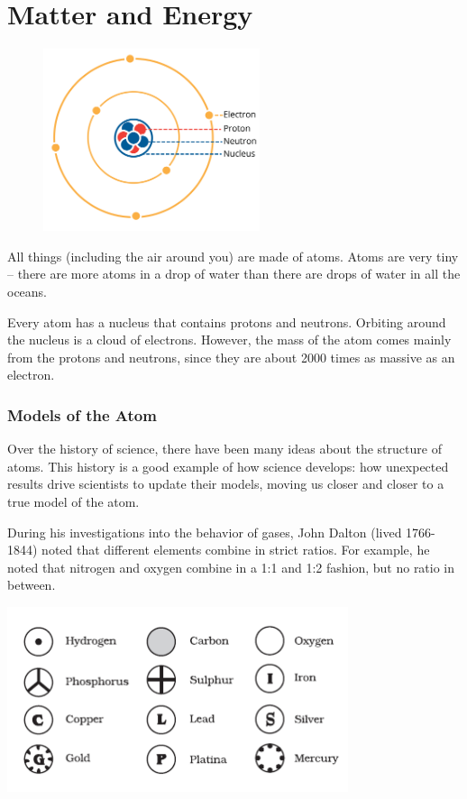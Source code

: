 \chapter{Matter and Energy}

\begin{figure}
\noindent\includegraphics[trim={0 5cm 0 0}, width=2.5in]{atom1.png}
\end{figure}

All things (including the air around you) are made of atoms. Atoms are
very tiny -- there are more atoms in a drop of water than there are
drops of water in all the oceans.


Every atom has a nucleus that contains protons and neutrons. Orbiting around the
nucleus is a cloud of electrons. However, the mass of the atom
comes mainly from the protons and neutrons, since they are about 2000 times as
massive as an electron.  


\subsection{Models of the Atom}
Over the history of science, there have been many ideas about the structure of
atoms. This history is a good example of how science develops: how unexpected
results drive scientists to update their models, moving us closer and closer to
a true model of the atom.

During his investigations into the behavior of gases,
John Dalton (lived 1766-1844) noted that different elements combine in strict
ratios. For example, he noted that nitrogen and oxygen combine in a 1:1 and 1:2
fashion, but no ratio in between.

\includegraphics[width=0.75\textwidth]{daltons_model.png}

